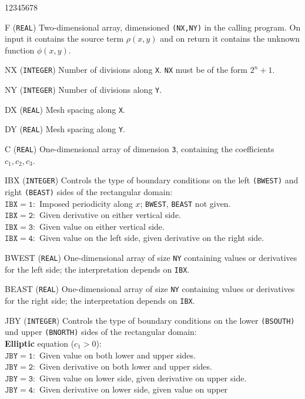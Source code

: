 \begin{DLtt}{12345678}
\item [F] ({\tt REAL}) Two-dimensional array, dimensioned {\tt (NX,NY)}
in the calling program. On input it contains the source term
$\rho(x,y)$ and on return it contains the unknown function $\phi (x,y)$.
\item [NX] ({\tt INTEGER}) Number of divisions along {\tt X}.
{\tt NX} must be of the form $2^n+1$.
\item [NY] ({\tt INTEGER}) Number of divisions along {\tt Y}.
\item [DX] ({\tt REAL}) Mesh spacing along {\tt X}.
\item [DY] ({\tt REAL}) Mesh spacing along {\tt Y}.
\item [C] ({\tt REAL}) One-dimensional array of dimension {\tt 3},
containing the coefficients $c_1,c_2,c_3$.
\item [IBX] ({\tt INTEGER}) Controls the type of boundary conditions on
the  left {\tt (BWEST)} and right {\tt (BEAST)} sides of the rectangular
domain:\\
$\mathtt{IBX=1}:$ Imposed periodicity along $x$; {\tt BWEST}, {\tt BEAST}
not given.\\
$\mathtt{IBX=2}:$ Given derivative on either vertical side.\\
$\mathtt{IBX=3}:$ Given value on either vertical side.\\
$\mathtt{IBX=4}:$ Given value on the left side, given derivative on the
right side.
\item [BWEST] ({\tt REAL}) One-dimensional array of size {\tt NY}
containing values or derivatives for the left side; the interpretation
depends on {\tt IBX}.
\item [BEAST] ({\tt REAL}) One-dimensional array of size {\tt NY}
containing values or derivatives for the right side; the interpretation
depends on {\tt IBX}.
\newpage
\item [JBY] ({\tt INTEGER}) Controls the
 type of boundary conditions on the lower {\tt (BSOUTH)} und upper
{\tt (BNORTH)} sides of the rectangular domain: \\
{\bf Elliptic} equation ($c_1>0$): \\
$\mathtt{JBY=1:}$ Given value on both lower and upper sides. \\
$\mathtt{JBY=2:}$ Given derivative on both lower and upper sides. \\
$\mathtt{JBY=3:}$ Given value on lower side, given derivative on upper
side.\\
$\mathtt{JBY=4:}$ Given derivative on lower side, given value on upper

\end{DLtt}
